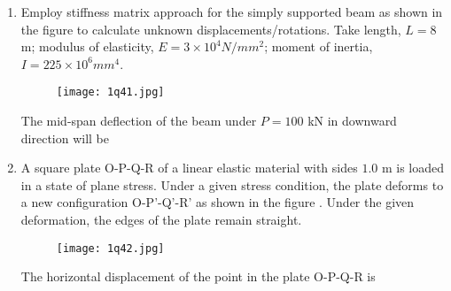 \documentclass[journal,12pt,onecolumn]{article}
\theoremstyle{remark}
\begin{document}
\begin{enumerate}
\hfill{}

\item Employ stiffness matrix approach for the simply supported beam as shown in the figure  to calculate unknown displacements/rotations. Take length, $L=8$ m; modulus of elasticity, $E = 3 \times 10^4 N/mm^2$; moment of inertia, $I = 225 \times 10^6 mm^4$.
\begin{figure}[H]
    \centering
    \texttt{[image: 1q41.jpg]}
    \caption{}
    \label{fig:q41}
\end{figure}
The mid-span deflection of the beam  under $P = 100$ kN in downward direction will be \underline{\hspace{2cm}}

\hfill{}

\item A square plate O-P-Q-R of a linear elastic material with sides $1.0$ m is loaded in a state of plane stress. Under a given stress condition, the plate deforms to a new configuration O-P'-Q'-R' as shown in the figure . Under the given deformation, the edges of the plate remain straight.
\begin{figure}[H]
    \centering
    \texttt{[image: 1q42.jpg]}
    \caption{}
    \label{fig:q42}
\end{figure}
The horizontal displacement of the point  in the plate O-P-Q-R  is \underline{\hspace{2cm}}

\hfill{}


\end{enumerate}
\end{document}
